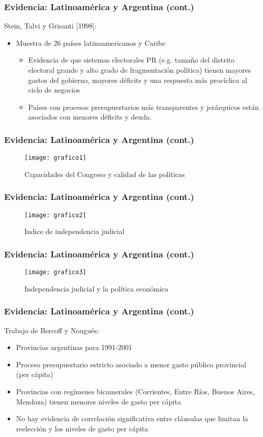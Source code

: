 \documentclass[handout,final,xcolor=dvipsnames]{beamer}
\begin{document}
\begin{frame}\frametitle{Evidencia: Latinoamérica y Argentina (cont.)}
Stein, Talvi y Grisanti [1998]: \medskip 
\begin{itemize} \itemsep 15pt
\item Muestra de 26 países latinoamericanos y Caribe \medskip 
\begin{itemize} \itemsep 10pt
\item Evidencia de que sistemas electorales PR (e.g. tamaño del distrito electoral grande
y alto grado de fragmentación política) tienen mayores gastos del gobierno, mayores déficits y una respuesta más procíclica al ciclo de negocios
\item Países con procesos presupuestarios más transparentes y jerárquicos están asociados con menores déficits y deuda.
\end{itemize}
\end{itemize}
\end{frame}



\begin{frame}\frametitle{Evidencia: Latinoamérica y Argentina (cont.)}
  \begin{figure}[htbp]
    \centering
    \texttt{[image: grafico1]}
\caption{Capacidades del Congreso y calidad de las políticas}
  \end{figure}
\end{frame}



\begin{frame}\frametitle{Evidencia: Latinoamérica y Argentina (cont.)}
\begin{figure}[htbp]
    \centering
    \texttt{[image: grafico2]}
\caption{Indice de independencia judicial}
  \end{figure}
\end{frame}


\begin{frame}\frametitle{Evidencia: Latinoamérica y Argentina (cont.)}
\begin{figure}[htbp]
    \centering
    \texttt{[image: grafico3]}
\caption{Independencia judicial y la política económica}
  \end{figure}
\end{frame}


\begin{frame}\frametitle{Evidencia: Latinoamérica y Argentina (cont.)}
Trabajo de Bercoff y Nougués: \medskip 
\begin{itemize}\itemsep 15pt
\item Provincias argentinas para 1991-2001
\item Proceso presupuestario estricto asociado a menor gasto público provincial (per cápita)
\item Provincias con regímenes bicamerales (Corrientes, Entre Ríos, Buenos Aires, Mendoza) tienen menores niveles de gasto per cápita
\item No hay evidencia de correlación significativa entre cláusulas que limitan la reelección y los niveles de gasto per cápita
\end{itemize}
\end{frame}
\end{document}
